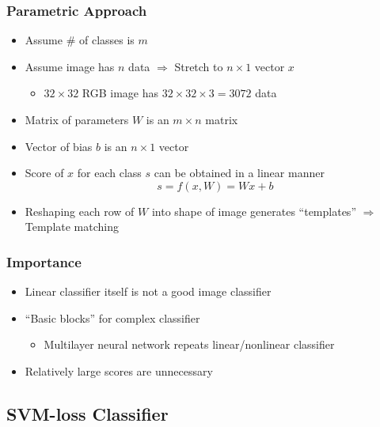 \subsubsection*{Parametric Approach}
\begin{itemize}
    \item Assume \# of classes is $m$
    \item Assume image has $n$ data $\Rightarrow$ Stretch to $n\times 1$ vector $x$
    \begin{itemize}
        \item $32\times 32$ RGB image has $32\times 32\times 3=3072$ data
    \end{itemize}
    \item Matrix of parameters $W$ is an $m\times n$ matrix
    \item Vector of bias $b$ is an $n\times 1$ vector
    \item Score of $x$ for each class $s$ can be obtained in a linear manner
    \begin{equation}
        s=f(x,W)=Wx+b
    \end{equation}
    \item Reshaping each row of $W$ into shape of image generates ``templates'' $\Rightarrow$ Template matching
\end{itemize}

\subsubsection*{Importance}
\begin{itemize}
    \item Linear classifier itself is not a good image classifier
    \item ``Basic blocks'' for complex classifier
    \begin{itemize}
        \item Multilayer neural network repeats linear/nonlinear classifier
    \end{itemize}
    \item Relatively large scores are unnecessary
\end{itemize}

\subsection{SVM-loss Classifier}

